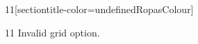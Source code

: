 \documentclass[paper=A4]{ropas-poster}
\begin{document}
\begin{postergrid}{1}{1}[sectiontitle-color=undefinedRopasColour]
\begin{posterblock}{1}{1}
Invalid grid option.
\end{posterblock}
\end{postergrid}
\end{document}
